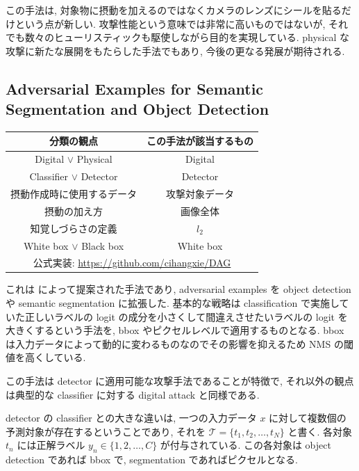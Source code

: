 この手法は, 対象物に摂動を加えるのではなくカメラのレンズにシールを貼るだけという点が新しい.
攻撃性能という意味では非常に高いものではないが, それでも数々のヒューリスティックも駆使しながら目的を実現している.
physical な攻撃に新たな展開をもたらした手法でもあり, 今後の更なる発展が期待される.



\subsection{Adversarial Examples for Semantic Segmentation and Object Detection}
\label{subsec:adversarial-examples}
%
\begin{table}[htbp]
\begin{center}
\begin{tabular}{|c|c|}
\hline
分類の観点 & この手法が該当するもの \\
\hline
Digital $\lor$ Physical & Digital \\
Classifier $\lor$ Detector & Detector \\
摂動作成時に使用するデータ & 攻撃対象データ \\
摂動の加え方 & 画像全体 \\
知覚しづらさの定義 & $l_2$ \\
White box $\lor$ Black box & White box \\
\hline
\multicolumn{2}{|c|}{公式実装: \href{https://github.com/cihangxie/DAG}{https://github.com/cihangxie/DAG}} \\
\hline
\end{tabular}
\label{tb:adversarial-example-summary}
\end{center}
\end{table}
%

これは \cite{xie2017adversarial} によって提案された手法であり, adversarial examples を object detection や semantic segmentation に拡張した.
基本的な戦略は classification で実施していた正しいラベルの logit の成分を小さくして間違えさせたいラベルの logit を大きくするという手法を, bbox やピクセルレベルで適用するものとなる.
bbox は入力データによって動的に変わるものなのでその影響を抑えるため NMS の閾値を高くしている.

この手法は detector に適用可能な攻撃手法であることが特徴で, それ以外の観点は典型的な classifier に対する digital attack と同様である.

detector の classifier との大きな違いは, 一つの入力データ $x$ に対して複数個の予測対象が存在するということであり, それを $\mathcal{T} = \{t_1, t_2, \dots, t_N\}$ と書く.
各対象 $t_n$ には正解ラベル $y_n \in \{1, 2, \dots, C\}$ が付与されている.
この各対象は object detection であれば bbox で, segmentation であればピクセルとなる.

